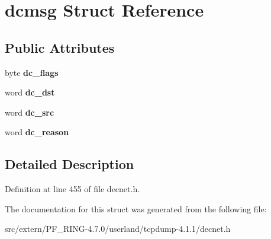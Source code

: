 \hypertarget{structdcmsg}{
\section{dcmsg Struct Reference}
\label{structdcmsg}
}
\subsection*{Public Attributes}
\begin{DoxyCompactItemize}
\item 
\hypertarget{structdcmsg_a32d040a18ab90764d802c8baf2f7c901}{
byte {\bfseries dc\_\-flags}}
\label{structdcmsg_a32d040a18ab90764d802c8baf2f7c901}

\item 
\hypertarget{structdcmsg_a12db6a1e551fd5525b7ed879410a9154}{
word {\bfseries dc\_\-dst}}
\label{structdcmsg_a12db6a1e551fd5525b7ed879410a9154}

\item 
\hypertarget{structdcmsg_ade5920c1ae2d1ba768f5e3802ce05e66}{
word {\bfseries dc\_\-src}}
\label{structdcmsg_ade5920c1ae2d1ba768f5e3802ce05e66}

\item 
\hypertarget{structdcmsg_a6c042f624c6ccf4cc25f9f5088ec112f}{
word {\bfseries dc\_\-reason}}
\label{structdcmsg_a6c042f624c6ccf4cc25f9f5088ec112f}

\end{DoxyCompactItemize}


\subsection{Detailed Description}


Definition at line 455 of file decnet.h.



The documentation for this struct was generated from the following file:\begin{DoxyCompactItemize}
\item 
src/extern/PF\_\-RING-\/4.7.0/userland/tcpdump-\/4.1.1/decnet.h\end{DoxyCompactItemize}
